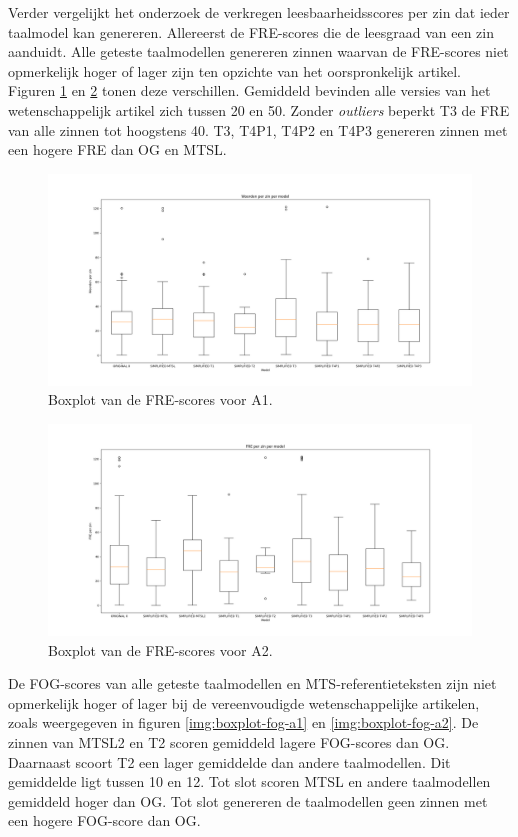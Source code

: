 Verder vergelijkt het onderzoek de verkregen leesbaarheidsscores per zin dat ieder taalmodel kan genereren. Allereerst de FRE-scores die de leesgraad van een zin aanduidt. Alle geteste taalmodellen genereren zinnen waarvan de FRE-scores niet opmerkelijk hoger of lager zijn ten opzichte van het oorspronkelijk artikel. Figuren \ref{img:boxplot-fre-a1} en \ref{img:boxplot-fre-a2} tonen deze verschillen. Gemiddeld bevinden alle versies van het wetenschappelijk artikel zich tussen 20 en 50. Zonder \textit{outliers} beperkt T3 de FRE van alle zinnen tot hoogstens 40. T3, T4P1, T4P2 en T4P3 genereren zinnen met een hogere FRE dan OG en MTSL. 

\begin{figure}[H]
	\includegraphics[width=\linewidth]{img/boxplot-fre-a1.png}
	\caption{Boxplot van de FRE-scores voor A1.}
	\label{img:boxplot-fre-a1}
\end{figure}

\begin{figure}[H]
	\includegraphics[width=\linewidth]{img/boxplot-fre-a2.png}
	\caption{Boxplot van de FRE-scores voor A2.}
	\label{img:boxplot-fre-a2}
\end{figure}

De FOG-scores van alle geteste taalmodellen en MTS-referentieteksten zijn niet opmerkelijk hoger of lager bij de vereenvoudigde wetenschappelijke artikelen, zoals weergegeven in figuren \ref{img:boxplot-fog-a1} en \ref{img:boxplot-fog-a2}. De zinnen van MTSL2 en T2 scoren gemiddeld lagere FOG-scores dan OG. Daarnaast scoort T2 een lager gemiddelde dan andere taalmodellen. Dit gemiddelde ligt tussen 10 en 12. Tot slot scoren MTSL en andere taalmodellen gemiddeld hoger dan OG. Tot slot genereren de taalmodellen geen zinnen met een hogere FOG-score dan OG.

